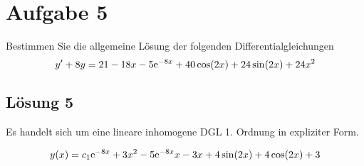 \documentclass[main.tex]{subfiles}
\begin{document}
\section{Aufgabe 5}
Bestimmen Sie die allgemeine Lösung der folgenden Differentialgleichungen
\[
    y' + 8y = 21 - 18x - 5\mathrm{e}^{-8x} + 40\cos(2x) + 24\sin(2x) + 24x^2
\]

\subsection{Lösung 5}
Es handelt sich um eine lineare inhomogene DGL 1. Ordnung in expliziter Form.

$$
    y(x) = c_1 \mathrm{e}^{-8 x} + 3 x^2 - 5 \mathrm{e}^{-8 x} x - 3 x + 4 \sin(2 x) + 4 \cos(2 x) + 3
$$
\end{document}
